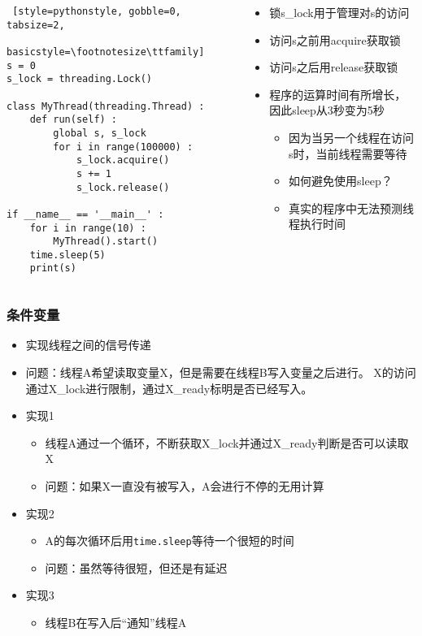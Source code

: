 \begin{CJK}{UTF8}{gbsn}
\begin{frame}[fragile]
\begin{columns}[T]
\begin{column}[T]{.5\textwidth}
\begin{lstlisting} [style=pythonstyle, gobble=0, tabsize=2,
								basicstyle=\footnotesize\ttfamily]
s = 0
s_lock = threading.Lock()

class MyThread(threading.Thread) :
	def run(self) :
		global s, s_lock
		for i in range(100000) :
			s_lock.acquire()
			s += 1
			s_lock.release()

if __name__ == '__main__' :
	for i in range(10) :
		MyThread().start()
	time.sleep(5)
	print(s)
			\end{lstlisting}
		\end{column}
		\begin{column}[T]{.5\textwidth}
			\begin{itemize}
			\item 锁s\_lock用于管理对s的访问
			\item 访问s之前用acquire获取锁
			\item 访问s之后用release获取锁
			\item 程序的运算时间有所增长，因此sleep从3秒变为5秒
				\begin{itemize}
				\item 因为当另一个线程在访问s时，当前线程需要等待
				\item 如何避免使用sleep？
				\item 真实的程序中无法预测线程执行时间
				\end{itemize}
			\end{itemize}
		\end{column}
	\end{columns}
\end{frame}

\begin{frame}
	\frametitle{条件变量}
	\begin{itemize}
	\item 实现线程之间的信号传递
	\item 问题：线程A希望读取变量X，但是需要在线程B写入变量之后进行。
			X的访问通过X\_lock进行限制，通过X\_ready标明是否已经写入。
	\item 实现1
		\begin{itemize}
		\item 线程A通过一个循环，不断获取X\_lock并通过X\_ready判断是否可以读取X
		\item 问题：如果X一直没有被写入，A会进行不停的无用计算
		\end{itemize}
	\item 实现2
		\begin{itemize}
		\item A的每次循环后用\texttt{time.sleep}等待一个很短的时间
		\item 问题：虽然等待很短，但还是有延迟
		\end{itemize}
	\item 实现3
		\begin{itemize}
		\item 线程B在写入后``通知''线程A
		\end{itemize}
	\end{itemize}
\end{frame}


\end{CJK}
